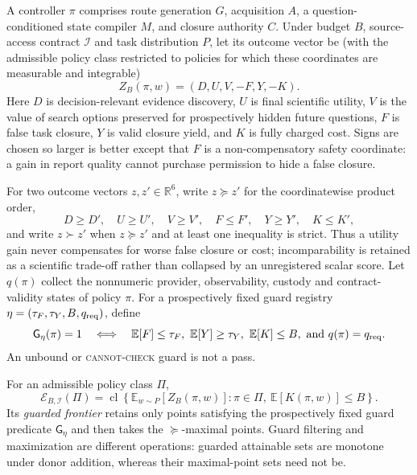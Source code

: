 A controller $\pi$ comprises route generation $G$, acquisition $A$, a
question-conditioned state compiler $M$, and closure authority $C$.  Under
budget $B$, source-access contract $\mathcal I$ and task distribution $P$, let
its outcome vector be (with the admissible policy class restricted to policies
for which these coordinates are measurable and integrable)
\[
 Z_B(\pi,w)=(D,U,V,-F,Y,-K).
\]
Here $D$ is decision-relevant evidence discovery, $U$ is final scientific
utility, $V$ is the value of search options preserved for prospectively hidden
future questions, $F$ is false task closure, $Y$ is valid closure yield, and
$K$ is fully charged cost.  Signs are chosen so larger is better except that
$F$ is a non-compensatory safety coordinate: a gain in report quality cannot
purchase permission to hide a false closure.

For two outcome vectors $z,z'\in\mathbb R^6$, write $z\succeq z'$ for the
coordinatewise product order,
\[
 D\geq D',\quad U\geq U',\quad V\geq V',\quad
 F\leq F',\quad Y\geq Y',\quad K\leq K',
\]
and write $z\succ z'$ when $z\succeq z'$ and at least one inequality is
strict. Thus a utility gain never compensates for worse false closure or cost;
incomparability is retained as a scientific trade-off rather than collapsed by
an unregistered scalar score. Let $q(\pi)$ collect the nonnumeric provider,
observability, custody and contract-validity states of policy $\pi$. For a
prospectively fixed guard registry
$\eta=(\tau_F,\tau_Y,B,q_{\rm req})$, define
\[
 \mathsf G_\eta(\pi)=1
 \quad\Longleftrightarrow\quad
 \mathbb E[F]\leq\tau_F,
 \ \mathbb E[Y]\geq\tau_Y,
 \ \mathbb E[K]\leq B,
 \ \text{and }q(\pi)=q_{\rm req}.
\]
An unbound or \textsc{cannot-check} guard is not a pass.

\begin{definition}
\label{def:acquisition-authority-envelope}
For an admissible policy class $\Pi$,
\[
 \mathcal E_{B,\mathcal I}(\Pi)
 =\operatorname{cl}\left\{
     \mathbb E_{w\sim P}[Z_B(\pi,w)] :
     \pi\in\Pi,\ \mathbb E[K(\pi,w)]\le B
   \right\}.
\]
Its \emph{guarded frontier} retains only points satisfying the prospectively
fixed guard predicate $\mathsf G_\eta$ and then takes the $\succeq$-maximal
points. Guard filtering and maximization are different operations: guarded
attainable sets are monotone under donor addition, whereas their maximal-point
sets need not be.
\end{definition}

